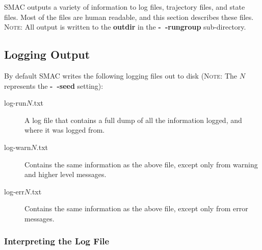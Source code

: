 \documentclass[manual.tex]{subfiles}
\begin{document}
\label{sec:output} 

SMAC outputs a variety of information to log files, trajectory files,
and state files. Most of the files are human readable, and this section
describes these files.
\\
\textsc{Note:} All output is written to the \textbf{outdir} in the \textbf{-~$\!$-rungroup} sub-directory.

\subsection{Logging Output}




By default SMAC writes the following logging files out to disk (\textsc{Note:} The $N$ represents the \textbf{-~$\!$-seed} setting): 
\begin{description}
\item [{log-run$N$.txt}] A log file that contains a full dump of all the information logged, and where it was logged from.
\item [{log-warn$N$.txt}] Contains the same information as the above file,
except only from warning and higher level messages.
\item [{log-err$N$.txt}] Contains the same information as the above file,
except only from error messages.

\end{description}


\subsubsection{Interpreting the Log File}
\end{document}
